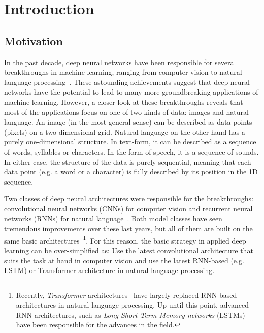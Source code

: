 \chapter{Introduction}
\label{chapter:Introduction}


\section{Motivation}
\label{sec:motivation}

In the past decade, deep neural networks have been responsible for several breakthroughs in machine learning, ranging from computer vision to natural language processing~\cite{Goodfellow-et-al-2016}. These astounding achievements suggest that deep neural networks have the potential to lead to many more groundbreaking applications of machine learning. However, a closer look at these breakthroughs reveals that most of the applications focus on one of two kinds of data: images and natural language. An image (in the most general sense) can be described as data-points (pixels) on a two-dimensional grid. Natural language on the other hand has a purely one-dimensional structure. In text-form, it can be described as a sequence of words, syllables or characters. In the form of speech, it is a sequence of sounds. In either case, the structure of the data is purely sequential, meaning that each data point (e.g. a word or a character) is fully described by its position in the 1D sequence.

Two classes of deep neural architectures were responsible for the breakthroughs: convolutional neural networks (CNNs) for computer vision and recurrent neural networks (RNNs) for natural language~\cite{Goodfellow-et-al-2016}. Both model classes have seen tremendous improvements over these last years, but all of them are built on the same basic architectures~\footnote{Recently, \textit{Transformer}-architectures~\cite{Vaswani2017} have largely replaced RNN-based architectures in natural language processing. Up until this point, advanced RNN-architectures, such as \textit{Long Short Term Memory networks} (LSTMs)~\cite{Hochreiter1997} have been responsible for the advances in the field.}. For this reason, the basic strategy in applied deep learning can be over-simplified as: Use the latest convolutional architecture that suits the task at hand in computer vision and use the latest RNN-based (e.g. LSTM) or Transformer architecture in natural language processing.


